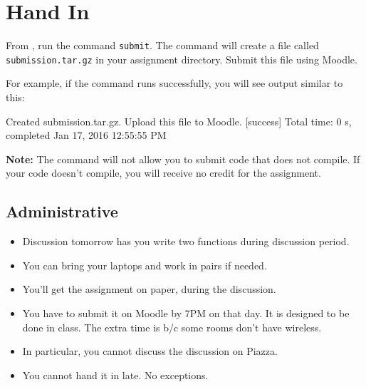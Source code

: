 \documentclass{book}
\begin{document}
\section{Hand In}

From \sbt{}, run the command \verb|submit|. The command will create
a file called \verb|submission.tar.gz| in your assignment directory.
Submit this file using Moodle.

For example, if the command runs successfully, you will see output similar
to this:
%
\begin{console}
Created submission.tar.gz. Upload this file to Moodle.
[success] Total time: 0 s, completed Jan 17, 2016 12:55:55 PM
\end{console}

\textbf{Note:}  The command will not allow you to submit code that does not
compile. If your code doesn't compile, you will receive no credit for the
assignment.

\newlecture

\begin{instructor}
\section{Administrative}

\begin{itemize}

  \item Discussion tomorrow has you write two functions during discussion period.

  \item You can bring your laptops and work in pairs if needed.

  \item You'll get the assignment on paper, during the discussion.

  \item You have to submit it on Moodle by 7PM on that day. It is designed
  to be done in class. The extra time is b/c some rooms don't have wireless.

  \item In particular, you cannot discuss the discussion on Piazza.

  \item You cannot hand it in late. No exceptions.

\end{itemize}

\end{instructor}
\end{document}
